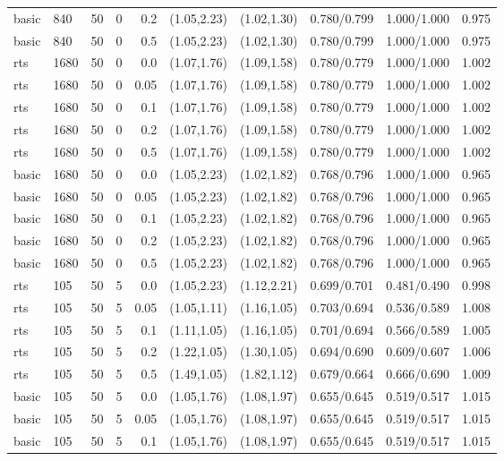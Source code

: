 \begin{tabular}{llrrrccccc}
basic & 840 & 50 & 0 & 0.2 & (1.05,2.23) & (1.02,1.30) & 0.780/0.799 & 1.000/1.000 & 0.975 \\
basic & 840 & 50 & 0 & 0.5 & (1.05,2.23) & (1.02,1.30) & 0.780/0.799 & 1.000/1.000 & 0.975 \\
rts & 1680 & 50 & 0 & 0.0 & (1.07,1.76) & (1.09,1.58) & 0.780/0.779 & 1.000/1.000 & 1.002 \\
rts & 1680 & 50 & 0 & 0.05 & (1.07,1.76) & (1.09,1.58) & 0.780/0.779 & 1.000/1.000 & 1.002 \\
rts & 1680 & 50 & 0 & 0.1 & (1.07,1.76) & (1.09,1.58) & 0.780/0.779 & 1.000/1.000 & 1.002 \\
rts & 1680 & 50 & 0 & 0.2 & (1.07,1.76) & (1.09,1.58) & 0.780/0.779 & 1.000/1.000 & 1.002 \\
rts & 1680 & 50 & 0 & 0.5 & (1.07,1.76) & (1.09,1.58) & 0.780/0.779 & 1.000/1.000 & 1.002 \\
basic & 1680 & 50 & 0 & 0.0 & (1.05,2.23) & (1.02,1.82) & 0.768/0.796 & 1.000/1.000 & 0.965 \\
basic & 1680 & 50 & 0 & 0.05 & (1.05,2.23) & (1.02,1.82) & 0.768/0.796 & 1.000/1.000 & 0.965 \\
basic & 1680 & 50 & 0 & 0.1 & (1.05,2.23) & (1.02,1.82) & 0.768/0.796 & 1.000/1.000 & 0.965 \\
basic & 1680 & 50 & 0 & 0.2 & (1.05,2.23) & (1.02,1.82) & 0.768/0.796 & 1.000/1.000 & 0.965 \\
basic & 1680 & 50 & 0 & 0.5 & (1.05,2.23) & (1.02,1.82) & 0.768/0.796 & 1.000/1.000 & 0.965 \\
rts & 105 & 50 & 5 & 0.0 & (1.05,2.23) & (1.12,2.21) & 0.699/0.701 & 0.481/0.490 & 0.998 \\
rts & 105 & 50 & 5 & 0.05 & (1.05,1.11) & (1.16,1.05) & 0.703/0.694 & 0.536/0.589 & 1.008 \\
rts & 105 & 50 & 5 & 0.1 & (1.11,1.05) & (1.16,1.05) & 0.701/0.694 & 0.566/0.589 & 1.005 \\
rts & 105 & 50 & 5 & 0.2 & (1.22,1.05) & (1.30,1.05) & 0.694/0.690 & 0.609/0.607 & 1.006 \\
rts & 105 & 50 & 5 & 0.5 & (1.49,1.05) & (1.82,1.12) & 0.679/0.664 & 0.666/0.690 & 1.009 \\
basic & 105 & 50 & 5 & 0.0 & (1.05,1.76) & (1.08,1.97) & 0.655/0.645 & 0.519/0.517 & 1.015 \\
basic & 105 & 50 & 5 & 0.05 & (1.05,1.76) & (1.08,1.97) & 0.655/0.645 & 0.519/0.517 & 1.015 \\
basic & 105 & 50 & 5 & 0.1 & (1.05,1.76) & (1.08,1.97) & 0.655/0.645 & 0.519/0.517 & 1.015 \\

\end{tabular}
